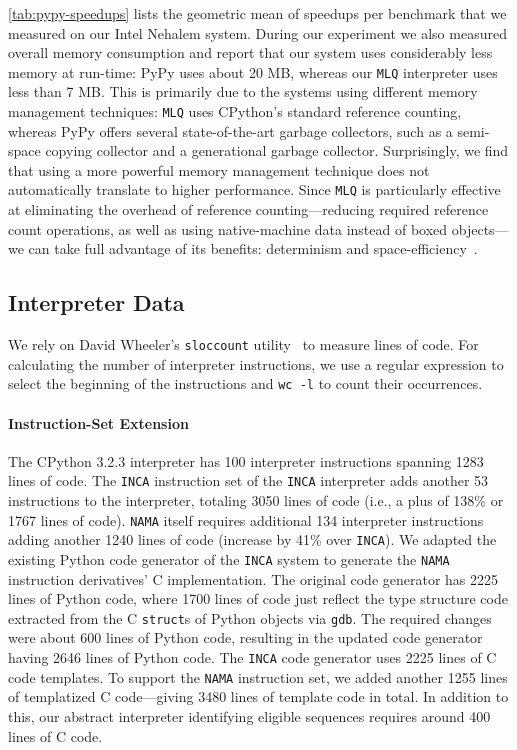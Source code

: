 \documentclass[preprint,10pt]{popl14conf}
\newcommand{\namaste}{\texttt{NAMA}}
\newcommand{\inca}{\texttt{INCA}}
\newcommand{\mlq}{\texttt{MLQ}}
\begin{document}
\autoref{tab:pypy-speedups} lists the geometric mean of speedups per benchmark that we measured on
our Intel Nehalem system.
During our experiment we also measured overall memory consumption and report that our system uses
considerably less memory at run-time: PyPy uses about 20 MB, whereas our \mlq{} interpreter uses
less than 7 MB.
This is primarily due to the systems using different memory management techniques: \mlq{} uses
CPython's standard reference counting, whereas PyPy offers several state-of-the-art garbage
collectors, such as a semi-space copying collector and a generational garbage collector.
Surprisingly, we find that using a more powerful memory management technique does not automatically
translate to higher performance.
Since \mlq{} is particularly effective at eliminating the overhead of reference counting---reducing
required reference count operations, as well as using native-machine data instead of boxed
objects---we can take full advantage of its benefits: determinism and
space-efficiency~\cite{deutsch.bobrow+76}.


\subsection{Interpreter Data}\label{ss:interpreter-data}



We rely on David Wheeler's \texttt{sloccount} utility~\cite{wheeler+10} to measure lines of code.
For calculating the number of interpreter instructions, we use a regular expression to select the
beginning of the instructions and \texttt{wc -l} to count their occurrences.

\paragraph{Instruction-Set Extension} The CPython 3.2.3 interpreter has 100 interpreter
instructions spanning 1283 lines of code.
The \inca{} instruction set of the \inca{} interpreter adds another 53 instructions to the
interpreter, totaling 3050 lines of code (i.e., a plus of 138\% or 1767 lines of code).
\namaste{} itself requires additional 134 interpreter instructions adding another 1240 lines of code
(increase by 41\% over \inca{}).
We adapted the existing Python code generator of the \inca{} system to generate the \namaste{}
instruction derivatives' C implementation.
The original code generator has 2225 lines of Python code, where 1700 lines of code just reflect
the type structure code extracted from the C \texttt{struct}s of Python objects via \texttt{gdb}.
The required changes were about 600 lines of Python code, resulting in the updated code generator
having 2646 lines of Python code.
The \inca{} code generator uses 2225 lines of C code templates.
To support the \namaste{} instruction set, we added another 1255 lines of templatized C
code---giving 3480 lines of template code in total.
In addition to this, our abstract interpreter identifying eligible sequences requires around 400
lines of C code.
\end{document}

